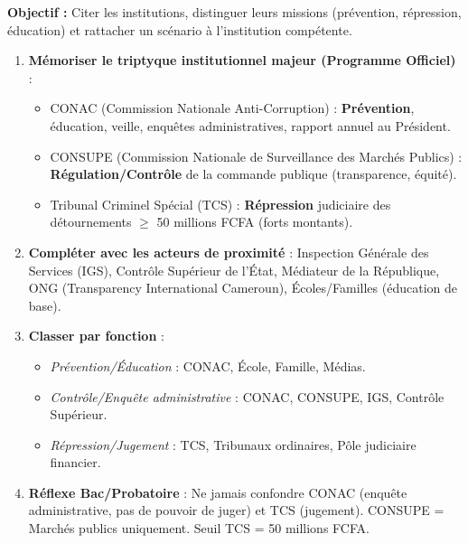 \documentclass[11pt]{article}
\newcommand{\cle}[1]{{\popxbold\color{popdark}#1}}
\begin{document}
\begin{methode}
    \textbf{Objectif :} Citer les institutions, distinguer leurs missions (prévention, répression, éducation) et rattacher un scénario à l'institution compétente.
    \begin{enumerate}
        \item \textbf{Mémoriser le triptyque institutionnel majeur (Programme Officiel)} :
            \begin{itemize}
                \item \cle{CONAC} (Commission Nationale Anti-Corruption) : \textbf{Prévention}, éducation, veille, enquêtes administratives, rapport annuel au Président.
                \item \cle{CONSUPE} (Commission Nationale de Surveillance des Marchés Publics) : \textbf{Régulation/Contrôle} de la commande publique (transparence, équité).
                \item \cle{Tribunal Criminel Spécial (TCS)} : \textbf{Répression} judiciaire des détournements $\ge$ 50 millions FCFA (forts montants).
            \end{itemize}
        \item \textbf{Compléter avec les acteurs de proximité} : Inspection Générale des Services (IGS), Contrôle Supérieur de l'État, Médiateur de la République, ONG (Transparency International Cameroun), Écoles/Familles (éducation de base).
        \item \textbf{Classer par fonction} :
            \begin{itemize}
                \item \textit{Prévention/Éducation} : CONAC, École, Famille, Médias.
                \item \textit{Contrôle/Enquête administrative} : CONAC, CONSUPE, IGS, Contrôle Supérieur.
                \item \textit{Répression/Jugement} : TCS, Tribunaux ordinaires, Pôle judiciaire financier.
            \end{itemize}
        \item \textbf{Réflexe Bac/Probatoire} : Ne jamais confondre CONAC (enquête administrative, pas de pouvoir de juger) et TCS (jugement). CONSUPE = Marchés publics uniquement. Seuil TCS = 50 millions FCFA.
    \end{enumerate}
\end{methode}
\end{document}

